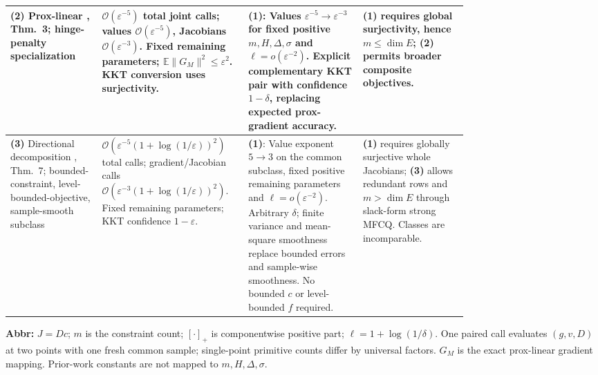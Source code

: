 \begin{table}[tp]
\begin{threeparttable}
\begin{tabularx}{\linewidth}{@{}>{\raggedright\arraybackslash}p{0.20\linewidth}>{\raggedright\arraybackslash}p{0.32\linewidth}>{\raggedright\arraybackslash}p{0.25\linewidth}>{\raggedright\arraybackslash}X@{}}
\midrule[1.2pt]
\textbf{(2)} Prox-linear \citep{cssiZhangXiaoV2}, Thm.~3; hinge-penalty specialization & $\mathcal{O}(\varepsilon^{-5})$ total joint calls; values $\mathcal{O}(\varepsilon^{-5})$, Jacobians $\mathcal{O}(\varepsilon^{-3})$. Fixed remaining parameters; $\mathbb{E}\|G_M\|^2\le\varepsilon^2$. KKT conversion uses surjectivity. & \textbf{(1)}: Values $\varepsilon^{-5}\to\varepsilon^{-3}$ for fixed positive $m,H,\Delta,\sigma$ and $\ell=o(\varepsilon^{-2})$. Explicit complementary KKT pair with confidence $1-\delta$, replacing expected prox-gradient accuracy. & \textbf{(1)} requires global surjectivity, hence $m\le\dim E$; \textbf{(2)} permits broader composite objectives. \\
\midrule
\textbf{(3)} Directional decomposition \citep{cssiShiWangV2}, Thm.~7; bounded-constraint, level-bounded-objective, sample-smooth subclass & $\mathcal{O}(\varepsilon^{-5}(1+\log(1/\varepsilon))^2)$ total calls; gradient/Jacobian calls $\mathcal{O}(\varepsilon^{-3}(1+\log(1/\varepsilon))^2)$. Fixed remaining parameters; KKT confidence $1-\varepsilon$. & \textbf{(1)}: Value exponent $5\to3$ on the common subclass, fixed positive remaining parameters and $\ell=o(\varepsilon^{-2})$. Arbitrary $\delta$; finite variance and mean-square smoothness replace bounded errors and sample-wise smoothness. No bounded $c$ or level-bounded $f$ required. & \textbf{(1)} requires globally surjective whole Jacobians; \textbf{(3)} allows redundant rows and $m>\dim E$ through slack-form strong MFCQ. Classes are incomparable. \\
\bottomrule
\end{tabularx}
\begin{tablenotes}[flushleft]\footnotesize
\item[] \textbf{Abbr:} $J=Dc$; $m$ is the constraint count; $[\cdot]_+$ is componentwise positive part; $\ell=1+\log(1/\delta)$. One paired call evaluates $(g,v,D)$ at two points with one fresh common sample; single-point primitive counts differ by universal factors. $G_M$ is the exact prox-linear gradient mapping. Prior-work constants are not mapped to $m,H,\Delta,\sigma$.
\end{tablenotes}
\end{threeparttable}
\end{table}
\clearpage
